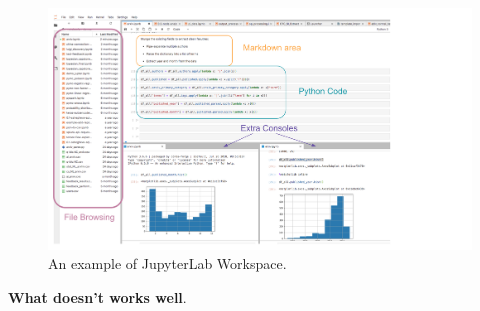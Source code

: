 \documentclass[12pt,letterpaper]{article}
\begin{document}
\begin{figure}[h]
\centering
\includegraphics[scale=.5]{figures/project-principles/jupyter.png}
\caption{An example of JupyterLab Workspace.}
\label{fig::1}
\end{figure}

\textbf{What doesn't works well}.

\end{document}

